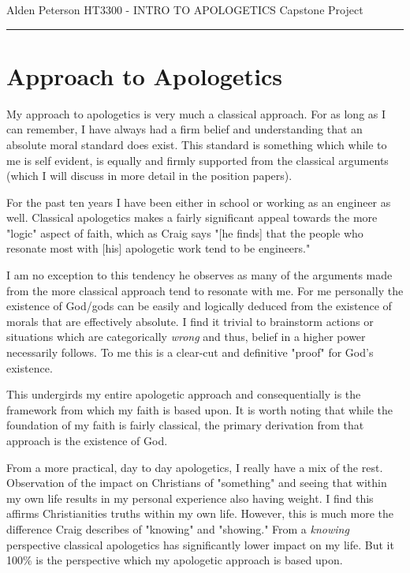 \documentclass[12pt]{turabian-researchpaper}
\begin{document}
\begin{singlespace}
\noindent Alden Peterson \newline
\noindent HT3300 - INTRO TO APOLOGETICS \newline
\noindent Capstone Project \newline
\noindent\rule{4cm}{0.4pt}
\end{singlespace}

\setcounter{tocdepth}{4}

\tableofcontents
\newpage

\section{Approach to Apologetics}

My approach to apologetics is very much a classical approach. For as long as I can remember, I have always had a firm belief and understanding that an absolute moral standard does exist. This standard is something which while to me is self evident, is equally and firmly supported from the classical arguments (which I will discuss in more detail in the position papers). 

For the past ten years I have been either in school or working as an engineer as well. Classical apologetics makes a fairly significant appeal towards the more "logic" aspect of faith, which as Craig says "[he finds] that the people who resonate most with [his] apologetic work tend to be engineers."\autocite[pg.22]{craig2008reasonable} 

I am no exception to this tendency he observes as many of the arguments made from the more classical approach tend to resonate with me. For me personally the existence of God/gods can be easily and logically deduced from the existence of morals that are effectively absolute. I find it trivial to brainstorm actions or situations which are categorically \textit{wrong} and thus, belief in a higher power necessarily follows. To me this is a clear-cut and definitive "proof" for God's existence.

This undergirds my entire apologetic approach and consequentially is the framework from which my faith is based upon. It is worth noting that while the foundation of my faith is fairly classical, the primary derivation from that approach is the existence of God. 

From a more practical, day to day apologetics, I really have a mix of the rest. Observation of the impact on Christians of "something" and seeing that within my own life results in my personal experience also having weight. I find this affirms Christianities truths within my own life. However, this is much more the difference Craig describes of "knowing" and "showing." From a \textit{knowing} perspective classical apologetics has significantly lower impact on my life. But it 100\% is the perspective which my apologetic approach is based upon.
 
\end{document}
